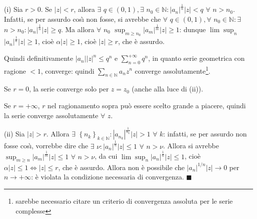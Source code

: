 \documentclass{article}
\begin{document}
(i) Sia $r>0$. Se $\left\vert z\right\vert <r$, allora $\exists $ $q\in
\left( 0,1\right) ,\exists $ $n_{0}\in 
\mathbb{N}
:\left\vert a_{n}\right\vert ^{\frac{1}{n}}\left\vert z\right\vert <q$ $%
\forall $ $n>n_{0}$. Infatti, se per assurdo cos\`{\i} non fosse, si avrebbe
che $\forall $ $q\in \left( 0,1\right) ,\forall $ $n_{0}\in 
\mathbb{N}
:\exists $ $n>n_{0}:\left\vert a_{n}\right\vert ^{\frac{1}{n}}\left\vert
z\right\vert \geq q$. Ma allora $\forall $ $n_{0}$ $\sup_{m\geq
n_{0}}\left\vert a_{m}\right\vert ^{\frac{1}{m}}\left\vert z\right\vert \geq
1$: dunque $\lim \sup_{n}$ $\left\vert a_{n}\right\vert ^{\frac{1}{n}%
}\left\vert z\right\vert \geq 1$, cio\`{e} $\alpha \left\vert z\right\vert
\geq 1$, cio\`{e} $\left\vert z\right\vert \geq r$, che \`{e} assurdo.

Quindi definitivamente $\left\vert a_{n}\right\vert \left\vert z\right\vert
^{n}\leq q^{n}$ e $\sum_{n=0}^{+\infty }q^{n}$, in quanto serie geometrica
con ragione $<1$, converge: quindi $\sum_{n\in 
\mathbb{N}
}a_{n}z^{n}$ converge assolutamente\footnote{%
sarebbe necessario citare un criterio di convergenza assoluta per le serie
complesse}.

Se $r=0$, la serie converge solo per $z=z_{0}$ (anche alla luce di (ii)).

Se $r=+\infty $, $r$ nel ragionamento sopra pu\`{o} essere scelto grande a
piacere, quindi la serie converge assolutamente $\forall $ $z$.

(ii) Sia $\left\vert z\right\vert >r$. Allora $\exists $ $\left\{
n_{k}\right\} _{k\in 
\mathbb{N}
}:\left\vert a_{n_{k}}\right\vert ^{\frac{1}{n_{k}}}\left\vert z\right\vert
>1$ $\forall $ $k$: infatti, se per assurdo non fosse cos\`{\i}, vorrebbe
dire che $\exists $ $\nu :\left\vert a_{n}\right\vert ^{\frac{1}{n}%
}\left\vert z\right\vert \leq 1$ $\forall $ $n>\nu $. Allora si avrebbe $%
\sup_{m\geq n}\left\vert a_{m}\right\vert ^{\frac{1}{m}}\left\vert
z\right\vert \leq 1$ $\forall $ $n>\nu $, da cui $\lim \sup_{n}\left\vert
a_{n}\right\vert ^{\frac{1}{n}}\left\vert z\right\vert \leq 1$, cio\`{e} $%
\alpha \left\vert z\right\vert \leq 1\Longleftrightarrow \left\vert
z\right\vert \leq r$, che \`{e} assurdo. Allora non \`{e} possibile che $%
\left\vert a_{n}\right\vert ^{1/n}\left\vert z\right\vert \rightarrow 0$ per 
$n\rightarrow +\infty $: \`{e} violata la condizione necessaria di
convergenza. $\blacksquare $
\end{document}
